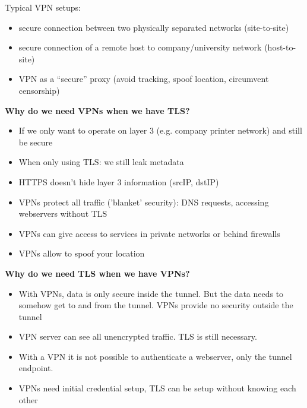 \documentclass[11pt,oneside,a4paper]{article}
\begin{document}
\noindent Typical VPN setups:

\vspace{-\topsep}
\begin{itemize}
	\setlength{\itemsep}{0pt}
	\setlength{\parskip}{0pt}
	\item secure connection between two physically separated networks (site-to-site)
	\item secure connection of a remote host to company/university network (host-to-site)
	\item VPN as a “secure” proxy (avoid tracking, spoof location, circumvent censorship)
\end{itemize}
\vspace{-\topsep}

\noindent \textbf{Why do we need VPNs when we have TLS?}

\vspace{-\topsep}
\begin{itemize}
	\setlength{\itemsep}{0pt}
	\setlength{\parskip}{0pt}
	\item If we only want to operate on layer 3 (e.g. company printer network) and still be secure
	\item When only using TLS: we still leak metadata
	\item HTTPS doesn't hide layer 3 information (srcIP, dstIP)
	\item VPNs protect all traffic ('blanket' security): DNS requests, accessing webservers without TLS
	\item VPNs can give access to services in private networks or behind firewalls
	\item VPNs allow to spoof your location
\end{itemize}
\vspace{-\topsep}

\noindent \textbf{Why do we need TLS when we have VPNs?}

\vspace{-\topsep}
\begin{itemize}
	\setlength{\itemsep}{0pt}
	\setlength{\parskip}{0pt}
	\item With VPNs, data is only secure inside the tunnel. But the data needs to somehow get to and from the tunnel. VPNs provide no security outside the tunnel
	\item VPN server can see all unencrypted traffic. TLS is still necessary.
	\item With a VPN it is not possible to authenticate a webserver, only the tunnel endpoint.
	\item VPNs need initial credential setup, TLS can be setup without knowing each other
\end{itemize}
\vspace{-\topsep}
\end{document}
